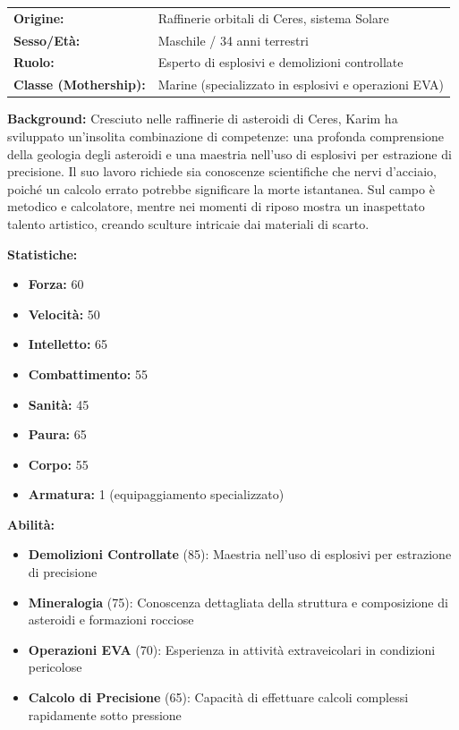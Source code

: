 \documentclass[11pt,a4paper]{article}
\begin{document}
\begin{tcolorbox}[colback=mininglightorange!20, colframe=miningorange]
\begin{tabularx}{\textwidth}{lX}
\textbf{Origine:} & Raffinerie orbitali di Ceres, sistema Solare \\
\textbf{Sesso/Età:} & Maschile / 34 anni terrestri \\
\textbf{Ruolo:} & Esperto di esplosivi e demolizioni controllate \\
\textbf{Classe (Mothership):} & Marine (specializzato in esplosivi e operazioni EVA) \\
\end{tabularx}

\textbf{Background:} Cresciuto nelle raffinerie di asteroidi di Ceres, Karim ha sviluppato un'insolita combinazione di competenze: una profonda comprensione della geologia degli asteroidi e una maestria nell'uso di esplosivi per estrazione di precisione. Il suo lavoro richiede sia conoscenze scientifiche che nervi d'acciaio, poiché un calcolo errato potrebbe significare la morte istantanea. Sul campo è metodico e calcolatore, mentre nei momenti di riposo mostra un inaspettato talento artistico, creando sculture intricaie dai materiali di scarto.

\textbf{Statistiche:}
\begin{itemize}[leftmargin=*]
\item \textbf{Forza:} 60
\item \textbf{Velocità:} 50
\item \textbf{Intelletto:} 65
\item \textbf{Combattimento:} 55
\item \textbf{Sanità:} 45
\item \textbf{Paura:} 65
\item \textbf{Corpo:} 55
\item \textbf{Armatura:} 1 (equipaggiamento specializzato)
\end{itemize}

\textbf{Abilità:}
\begin{itemize}[leftmargin=*]
\item \textbf{Demolizioni Controllate} (85): Maestria nell'uso di esplosivi per estrazione di precisione
\item \textbf{Mineralogia} (75): Conoscenza dettagliata della struttura e composizione di asteroidi e formazioni rocciose
\item \textbf{Operazioni EVA} (70): Esperienza in attività extraveicolari in condizioni pericolose
\item \textbf{Calcolo di Precisione} (65): Capacità di effettuare calcoli complessi rapidamente sotto pressione
\end{itemize}


\end{tcolorbox}
\end{document}

